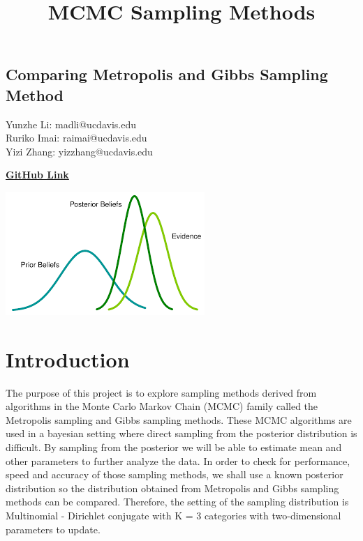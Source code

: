 \documentclass[11pt,a4paper]{article}
\begin{document}
\title{MCMC Sampling Methods}
\pagestyle{fancy}

{
\fancyhf{}
\cfoot{\thepage}
}

\vspace*{\fill}
\begin{center}
\subsection*{ 
\huge Comparing Metropolis and Gibbs Sampling Method
}
\end{center}

\begin{center}
Yunzhe Li: madli@ucdavis.edu \\
Ruriko Imai: raimai@ucdavis.edu \\
Yizi Zhang: yizzhang@ucdavis.edu
\end{center}

\begin{center}
\href{https://github.com/imaination/Bayesian}{\textbf{GitHub Link}}
\end{center}

\bigskip
\bigskip
\bigskip
\bigskip
\bigskip
\bigskip
\bigskip
\bigskip
\bigskip
\bigskip
\bigskip
\bigskip


\begin{center}
\includegraphics[scale=1.5]{images/cover.png}
\end{center}
\vspace*{\fill}
\newpage


\section*{Introduction}
The purpose of this project is to explore sampling methods derived from algorithms in the Monte Carlo Markov Chain (MCMC) family called the Metropolis sampling and Gibbs sampling methods. These MCMC algorithms are used in a bayesian setting where direct sampling from the posterior distribution is difficult. By sampling from the posterior we will be able to estimate mean and other parameters to further analyze the data. In order to check for performance, speed and accuracy of those sampling methods, we shall use a known posterior distribution so the distribution obtained from Metropolis and Gibbs sampling methods can be compared. Therefore, the  setting of the sampling distribution is Multinomial - Dirichlet conjugate with K = 3 categories with two-dimensional parameters to update. 
\end{document}
